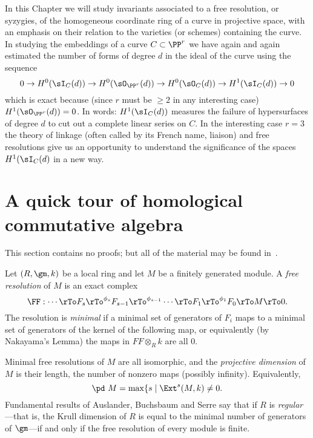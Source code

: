 In this Chapter we will study  invariants associated to a free resolution, or syzygies, of the homogeneous coordinate ring of a curve in projective space, with an emphasis on their relation to the varieties (or schemes) containing the curve. 
In studying the embeddings of a curve $C\subset \PP^r$  we have again and again estimated the number of
forms of degree $d$ in the ideal of the curve using the sequence
$$
0\to H^0(\sI_C(d)) \to H^0(\sO_{\PP^r}(d))\to  H^0(\sO_C(d)) \to H^1(\sI_C(d))\to 0
$$
which is exact because (since $r$ must be $\geq 2$ in any interesting case) $H^1(\sO_{\PP^r}(d))= 0$. In words: 
$H^1(\sI_C(d))$ measures the failure of hypersurfaces of degree $d$ to cut out a complete linear series on $C$.
In the interesting case $r=3$ the theory of linkage (often called by its French name, liaison) and free resolutions give us an opportunity
to understand the significance of the spaces $H^1(\sI_C(d)$ in a new way. 

\section{A quick tour of homological commutative algebra}
This section contains no proofs; but all of the material may be found in~\cite{Eisenbud1995}.

Let $(R,\gm, k)$ be a local ring and let $M$ be a finitely generated module. A \emph{free resolution} of $M$ is an exact complex
$$
\FF: \cdots \rTo F_s \rTo^{\phi_s} F_{s-1} \rTo^{\phi_{s-1}} \cdots \rTo F_1 \rTo^{\phi_1}  F_0 \rTo M \rTo 0.
$$
The resolution is \emph{minimal} if a minimal set of generators of $F_i$ maps to a minimal set of generators of the kernel of the following map,
or equivalently (by Nakayama's Lemma) the maps in $FF\otimes_R k$ are all 0.

Minimal free resolutions of $M$ are all isomorphic, and the \emph{projective dimension}  of $M$ is their length, the number of nonzero
maps (possibly infinity). Equivalently, 
$$
\pd\ M = \max\{s \mid \Ext^s(M,k) \neq 0.
$$
Fundamental
results of Auslander, Buchsbaum and Serre say that if $R$ is \emph{regular}---that is, the Krull dimension of $R$ is equal to the minimal number
of generators of $\gm$---if and only if the free resolution of every module is finite.

